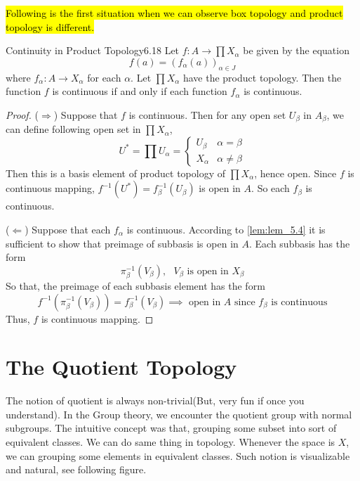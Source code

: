 \documentclass[12pt, a4paper, twoside]{article}
\theoremstyle{plain}
\begin{document}
\newpage 
\hl{Following is the first situation when we can observe box topology and product topology is different.}
\begin{thm}{Continuity in Product Topology}{6.18}
    Let $f: A \rightarrow \prod X_\alpha$ be given by the equation 
    \[f(a) = (f_\alpha(a))_{\alpha \in J}\]
    where $f_\alpha: A \rightarrow X_\alpha$ for each $\alpha$. Let $\prod X_\alpha$ have the product topology. 
    Then the function $f$ is continuous if and only if each function $f_\alpha$ is continuous. 
\end{thm}

\begin{proof}
    ($\Rightarrow$) Suppose that $f$ is continuous. 
    Then for any open set $U_\beta$ in $A_\beta$, we can define following open set in $\prod X_\alpha$, 
    \[U^* = \prod U_\alpha = \begin{cases}
        U_\beta & \alpha = \beta \\
        X_\alpha & \alpha \neq \beta
    \end{cases}\]
    Then this is a basis element of product topology of $\prod X_\alpha$, hence open. 
    Since $f$ is continuous mapping, $f^{-1}(U^*) = f_\beta^{-1}(U_\beta)$ is open in $A$. So each $f_\beta$ is continuous. 

    ($\Leftarrow$) Suppose that each $f_\alpha$ is continuous. According to \ref{lem:lem_5.4} it is sufficient to show that 
    preimage of subbasis is open in $A$. Each subbasis has the form 
    \[\pi^{-1}_\beta(V_\beta), \text{ $V_\beta$ is open in $X_\beta$}\]
    So that, the preimage of each subbasis element has the form 
    \[f^{-1}(\pi^{-1}_\beta(V_\beta)) = f_\beta^{-1}(V_\beta) \implies \text{ open in $A$ since $f_\beta$ is continuous}\]
    Thus, $f$ is continuous mapping. 
\end{proof}

\newpage 

\section{The Quotient Topology}

The notion of quotient is always non-trivial(But, very fun if once you understand). 
In the Group theory, we encounter the quotient group with normal subgroups. 
The intuitive concept was that, grouping some subset into sort of equivalent classes. 
We can do same thing in topology. Whenever the space is $X$, we can grouping some elements in equivalent classes. 
Such notion is visualizable and natural, see following figure. 
\end{document}
